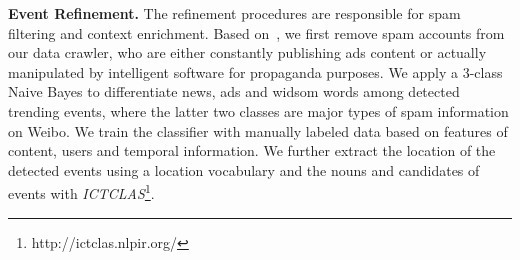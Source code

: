 \noindent\textbf{Event Refinement.}
\label{refinement}
The refinement procedures are responsible for spam filtering and context enrichment.
Based on~\cite{liu2013many}, we first remove spam accounts from our data crawler,
who are either constantly publishing ads content or actually manipulated by intelligent software for propaganda purposes.
We apply a 3-class Naive Bayes to differentiate news, ads and widsom words among detected trending events,
where the latter two classes are major types of spam information on Weibo.
We train the classifier with manually labeled data based on features of content, users and temporal information.
We further extract the location of the detected events using a location vocabulary
and the nouns and candidates of events with \emph{ICTCLAS}\footnote{http://ictclas.nlpir.org/}.

